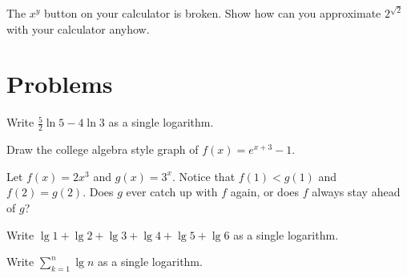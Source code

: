 \begin{exer}
 The $x^y$ button on your calculator is broken. Show how can you approximate $2^{\sqrt{2}}$ with your calculator anyhow.
\end{exer}

\clearpage

\section{Problems}

\begin{prob}
Write $\displaystyle \frac{5}{2}\ln{5} - 4 \ln{3}$ as a single logarithm.
\end{prob}

\begin{prob}
 Draw the college algebra style graph of $f(x) = e^{x+3} -1$.
\end{prob}

\begin{prob}
Let $f(x) = 2x^3$ and $g(x) = 3^x$. Notice that $f(1) < g(1)$ and $f(2) = g(2)$. Does $g$ ever 
catch up with $f$ again, or does $f$ always stay ahead of $g$?
\end{prob}

\begin{prob}
Write $\lg 1+ \lg 2 + \lg 3 + \lg 4 + \lg 5 + \lg 6$ as a single logarithm.
\end{prob}

\begin{prob}
Write $\displaystyle \sum_{k=1}^{n} \lg{n}$ as a single logarithm.
\end{prob}